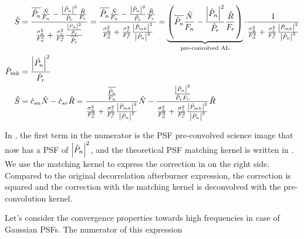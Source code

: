 \begin{align}
  \hat{S} &= 
            \frac{\overline{\hat{P}_n} \frac{\hat{N}}{F_n} -
            \frac{\abs{\hat{P}_n}^2}{\hat{P}_r} \frac{\hat{R}}{F_r} }
            { \frac{\sigma_n^2}{F_n^2} +
            \frac{\sigma_r^2}{F_r^2}
            \frac{\frac{\abs{\hat{P_n}}^2}{\hat{P}_r}}
            {\overline{\hat{P}_r}}         
            } =
            \frac{\overline{\hat{P}_n} \frac{\hat{N}}{F_n} -
            \frac{\abs{\hat{P}_n}^2}{\hat{P}_r} \frac{\hat{R}}{F_r} }
            { \frac{\sigma_n^2}{F_n^2} +
            \frac{\sigma_r^2}{F_r^2}
            \frac{\abs{\hat{P}_{mk}}^2}{\abs{\hat{P}_{n}}^2}
            } = 
            \underbrace{\left(
            \overline{\hat{P}_n} \frac{\hat{N}}{F_n} -
            \frac{\abs{\hat{P}_n}^2}{\hat{P}_r} \frac{\hat{R}}{F_r}
            \right)}_{\textrm{pre-convolved AL}} \cdot
            \frac{1}
            { \frac{\sigma_n^2}{F_n^2} +
            \frac{\sigma_r^2}{F_r^2}
            \frac{\abs{\hat{P}_{mk}}^2}{\abs{\hat{P}_{n}}^2}
            }
            \label{eq:SPre}\\
  \hat{P}_{mk} &= \frac{\abs{\hat{P_n}}^2}{\hat{P}_r} \label{eq:Smk}\\
  \hat{S} &= \hat{c}_{sn} \hat{N} - \hat{c}_{sr}\hat{R} =
            \frac{\frac{\overline{\hat{P}_n}}{ F_n} }
            { \frac{\sigma_n^2}{F_n^2} +
            \frac{\sigma_r^2}{F_r^2}
            \frac{\abs{\hat{P}_{mk}}^2}{\abs{\hat{P}_{n}}^2}
            } \hat{N}
            -
            \frac{
            \frac{\abs{\hat{P}_n}^2}{\hat{P}_rF_r} }
            { \frac{\sigma_n^2}{F_n^2} +
            \frac{\sigma_r^2}{F_r^2}
            \frac{\abs{\hat{P}_{mk}}^2}{\abs{\hat{P}_{n}}^2}
            } \hat{R}\label{eq:Scncr}
\end{align}
%
\par In , the first term in the numerator is the PSF
pre-convolved science image that now has a PSF of
\(\abs{\hat{P}_n}^2\), and the theoretical PSF matching kernel is
written in . We use the matching kernel to express the
correction in  on the right side. Compared to the
original decorrelation afterburner expression, the correction is
squared and the correction with the matching kernel is deconvolved
with the pre-convolution kernel.
%
\par Let's consider the convergence properties towards high
frequencies in case of Gaussian PSFs. The numerator of this expression
